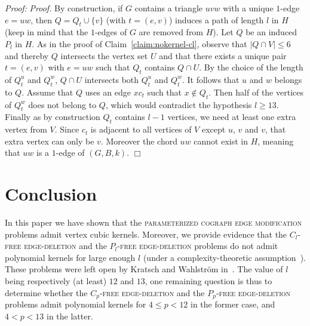 \documentclass[11pt]{article}
\newenvironment{proof}{\noindent\textit{Proof: }}{{\hfill $\Box$}}
\begin{document}
\begin{proof}
\emph{Proof.} By construction, if $G$ contains a triangle $uvw$ with a unique $1$-edge $e=uw$, then $Q=Q_t\cup\{v\}$ (with $t=(e,v)$) induces a path of length $l$ in $H$ (keep in mind that the $1$-edges of $G$ are removed from $H$).
Let $Q$ be an induced $P_l$ in $H$. As in the proof of Claim~\ref{claim:nokernel-cl}, observe that $|Q\cap V|\leqslant 6$ and thereby $Q$ intersects the vertex set $U$ and that there exists a unique pair $t=(e,v)$ with $e=uw$ such that $Q_t$ contains $Q\cap U$. By the choice of the length of $Q_t^u$ and $Q_t^w$, $Q\cap U$ intersects both $Q_t^u$ and $Q_t^w$. It follows that $u$ and $w$ belongs to $Q$. Assume that $Q$ uses an edge $xc_t$ such that $x\notin Q_t$. Then half of the vertices of $Q_t^w$ does not belong to $Q$, which would contradict the hypothesis $l\geqslant 13$. Finally as by construction $Q_t$ contains $l-1$ vertices, we need at least one extra vertex from $V$. Since $c_t$ is adjacent to all vertices of $V$ except $u$, $v$ and $v$, that extra vertex can only be $v$. Moreover the chord $uw$ cannot exist in $H$, meaning that $uw$ is a $1$-edge of $(G,B,k)$.
\end{proof}
 
 \section{Conclusion}
 
In this paper we have shown that the \textsc{parameterized cograph edge modification} problems admit vertex cubic kernels. Moreover, we provide evidence that the \textsc{$C_l$-free edge-deletion} and the \textsc{$P_l$-free edge-deletion} problems do not admit polynomial kernels for large enough $l$ (under a complexity-theoretic assumption~\cite{BDFH08}). These problems were left open by Kratsch and Wahlstr\"om in~\cite{KW09}. The value of $l$ being respectively (at least) $12$ and $13$, one remaining question is thus to determine whether the \textsc{$C_p$-free edge-deletion} and the \textsc{$P_p$-free edge-deletion} problems admit polynomial kernels for $4 \leqslant p < 12$ in the former case, and $4 < p < 13$ in the latter. 



\end{document}
